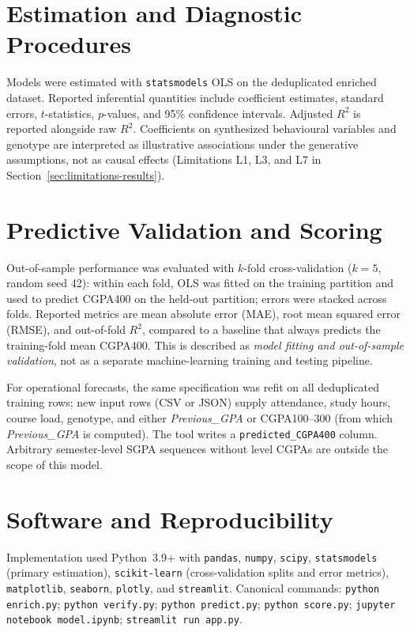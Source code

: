 \documentclass[12pt]{report}
\begin{document}
	\section{Estimation and Diagnostic Procedures}
	Models were estimated with \texttt{statsmodels} OLS on the deduplicated enriched dataset. Reported inferential quantities include coefficient estimates, standard errors, $t$-statistics, $p$-values, and 95\% confidence intervals. Adjusted $R^2$ is reported alongside raw $R^2$. Coefficients on synthesized behavioural variables and genotype are interpreted as illustrative associations under the generative assumptions, not as causal effects (Limitations L1, L3, and L7 in Section~\ref{sec:limitations-results}).
	
	\section{Predictive Validation and Scoring}
	Out-of-sample performance was evaluated with $k$-fold cross-validation ($k = 5$, random seed 42): within each fold, OLS was fitted on the training partition and used to predict CGPA400 on the held-out partition; errors were stacked across folds. Reported metrics are mean absolute error (MAE), root mean squared error (RMSE), and out-of-fold $R^2$, compared to a baseline that always predicts the training-fold mean CGPA400. This is described as \textit{model fitting and out-of-sample validation}, not as a separate machine-learning training and testing pipeline.
	
	For operational forecasts, the same specification was refit on all deduplicated training rows; new input rows (CSV or JSON) supply attendance, study hours, course load, genotype, and either \textit{Previous\_GPA} or CGPA100--300 (from which \textit{Previous\_GPA} is computed). The tool writes a \texttt{predicted\_CGPA400} column. Arbitrary semester-level SGPA sequences without level CGPAs are outside the scope of this model.
	
	\section{Software and Reproducibility}
	Implementation used Python~3.9+ with \texttt{pandas}, \texttt{numpy}, \texttt{scipy}, \texttt{statsmodels} (primary estimation), \texttt{scikit-learn} (cross-validation splits and error metrics), \texttt{matplotlib}, \texttt{seaborn}, \texttt{plotly}, and \texttt{streamlit}. Canonical commands: \texttt{python enrich.py}; \texttt{python verify.py}; \texttt{python predict.py}; \texttt{python score.py}; \texttt{jupyter notebook model.ipynb}; \texttt{streamlit run app.py}.
	
\end{document}
